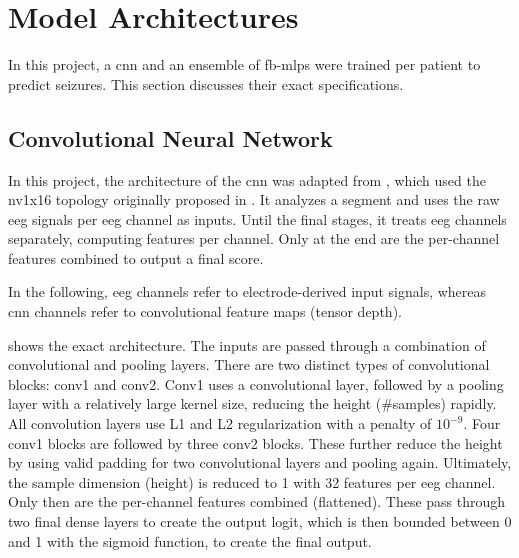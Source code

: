 \section{Model Architectures}\label{sec:model-architectures}
In this project, a \gls{cnn} and an ensemble of \glspl{fb-mlp} were trained per patient to predict seizures.
This section discusses their exact specifications.

\subsection{Convolutional Neural Network}\label{subsec:cnn-architecture}
In this project, the architecture of the \gls{cnn} was adapted from \textcite{muller_coherent_2022}, which used the nv1x16 topology originally proposed in \textcite{eberlein_convolutional_2018}.
It analyzes a segment and uses the raw \gls{eeg} signals per \gls{eeg} channel as inputs.
Until the final stages, it treats \gls{eeg} channels separately, computing features per channel.
Only at the end are the per-channel features combined to output a final score.

In the following, \gls{eeg} channels refer to electrode-derived input signals, whereas \gls{cnn} channels refer to convolutional feature maps (tensor depth).

 shows the exact architecture.
The inputs are passed through a combination of convolutional and pooling layers.
There are two distinct types of convolutional blocks: conv1 and conv2.
Conv1 uses a convolutional layer, followed by a pooling layer with a relatively large kernel size, reducing the height (\#samples) rapidly.
All convolution layers use L1 and L2 regularization with a penalty of $10^{-9}$.
Four conv1 blocks are followed by three conv2 blocks.
These further reduce the height by using valid padding for two convolutional layers and pooling again.
Ultimately, the sample dimension (height) is reduced to 1 with 32 features per \gls{eeg} channel.
Only then are the per-channel features combined (flattened).
These pass through two final dense layers to create the output logit, which is then bounded between 0 and 1 with the sigmoid function, to create the final output.


